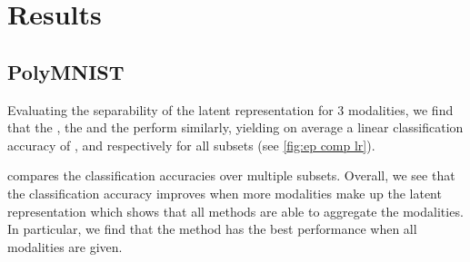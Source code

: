\section{Results}




\subsection{PolyMNIST} \label{subsec: results polymnist}
Evaluating the separability of the latent representation for 3 modalities, we find that the , the  and the  perform similarly, yielding on average a linear classification accuracy of ,  and  respectively for all subsets (see \cref{fig:ep comp lr}).

\smallskip

 compares the classification accuracies over multiple subsets.
Overall, we see that the classification accuracy improves when more modalities make up the latent representation which shows that all methods are able to aggregate the modalities.
In particular, we find that the  method has the best performance when all modalities are given.



\begin{sansmath}
\end{sansmath}


